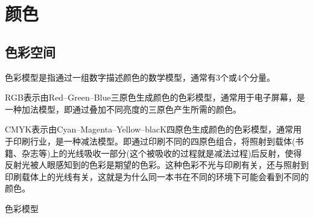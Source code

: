 
\chapter{颜色}
\label{chap:color}

\section{色彩空间}
\label{sec:color-space}

\begin{definition}
  色彩模型是指通过一组数字描述颜色的数学模型，通常有3个或4个分量。
\end{definition}

\begin{example}
  {\color{red}R}{\color{green}G}{\color{blue}B}表示由{\color{red}Red}--{\color{green}Green}--{\color{blue}Blue}三原色生成颜色的色彩模型，通常用于电子屏幕，是一种加法模型，即通过叠加不同亮度的三原色产生所需的颜色。
\end{example}

\begin{example}[CMYK色彩模型]
  {\color{cyan}C}{\color{magenta}M}{\color{yellow}Y}{\color{black}K}表示由{\color{cyan}Cyan}--{\color{magenta}Magenta}--{\color{yellow}Yellow}--{\color{black}blacK}四原色生成颜色的色彩模型，通常用于印刷行业，是一种减法模型。即通过印刷不同的四原色组合，将照射到载体(书籍、杂志等)上的光线吸收一部分(这个被吸收的过程就是减法过程)后反射，使得反射光被人眼感知到的色彩是期望的色彩。这种色彩不光与印刷有关，还与照射到印刷载体上的光线有关，这就是为什么同一本书在不同的环境下可能会看到不同的颜色。
\end{example}

\begin{example}[HSV色彩模型]
  
\end{example}

\begin{definition}[YUV]
  
\end{definition}

\begin{definition}[色域]
  
\end{definition}

\begin{definition}
  色彩模型
\end{definition}

\begin{example}[sRGB色彩空间]
  
\end{example}

